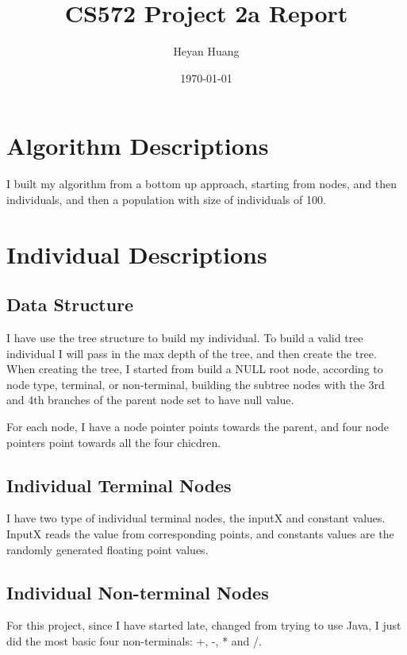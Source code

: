 \documentclass[10pt,b5paper]{article}
\author{Heyan Huang}
\date{\today}
\title{CS572 Project 2a Report}
\begin{document}
\maketitle
\tableofcontents


\section{Algorithm Descriptions}
\label{sec-1}
I built my algorithm from a bottom up approach, starting from nodes, and then individuals, and then a population with size of individuals of 100. 
\section{Individual Descriptions}
\label{sec-2}
\subsection{Data Structure}
\label{sec-2-1}
I have use the tree structure to build my individual. To build a valid tree individual I will pass in the max depth of the tree, and then create the tree. When creating the tree, I started from build a NULL root node, according to node type, terminal, or non-terminal, building the subtree nodes with the 3rd and 4th branches of the parent node set to have null value. 

For each node, I have a node pointer points towards the parent, and four node pointers point towards all the four chicdren.

\subsection{Individual Terminal Nodes}
\label{sec-2-2}
I have two type of individual terminal nodes, the inputX and constant values. InputX reads the value from corresponding points, and  constants values are the randomly generated floating point values.

\subsection{Individual Non-terminal Nodes}
\label{sec-2-3}
For this project, since I have started late, changed from trying to use Java, I just did the most basic four non-terminals: +, -, * and /.
\end{document}
